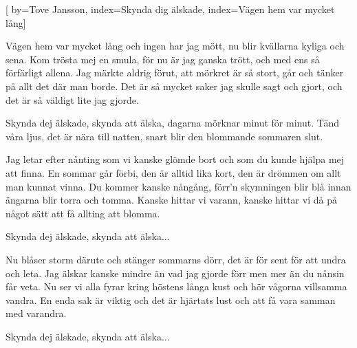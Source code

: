 


[ 	%
	by={Tove Jansson},
	index={Skynda dig älskade},
	index={Vägen hem var mycket lång}]		%
	
\beginverse*		%
Vägen hem var mycket lång och ingen har jag mött,
nu blir kvällarna kyliga och sena.
Kom trösta mej en smula, för nu är jag ganska trött,
och med ens så förfärligt allena.
Jag märkte aldrig förut, att mörkret är så stort,
går och tänker på allt det där man borde.
Det är så mycket saker jag skulle sagt och gjort,
och det är så väldigt lite jag gjorde.
\endverse			%

\beginchorus
Skynda dej älskade, skynda att älska,
dagarna mörknar minut för minut.
Tänd våra ljus, det är nära till natten,
snart blir den blommande sommaren slut.
\endchorus

\beginverse*		%
Jag letar efter nånting som vi kanske glömde bort
och som du kunde hjälpa mej att finna.
En sommar går förbi, den är alltid lika kort,
den är drömmen om allt man kunnat vinna.
Du kommer kanske nångång, förr'n skymningen blir blå
innan ängarna blir torra och tomma.
Kanske hittar vi varann, kanske hittar vi då på
något sätt att få allting att blomma.
\endverse			%

\beginchorus
Skynda dej älskade, skynda att älska...
\endchorus

\newpage
\beginverse*		%
Nu blåser storm därute och stänger sommarns dörr,
det är för sent för att undra och leta.
Jag älskar kanske mindre än vad jag gjorde förr
men mer än du nånsin får veta.
Nu ser vi alla fyrar kring höstens långa kust
och hör vågorna villsamma vandra.
En enda sak är viktig och det är hjärtats lust
och att få vara samman med varandra.
\endverse			%

\beginchorus
Skynda dej älskade, skynda att älska...
\endchorus
\endsong			%

